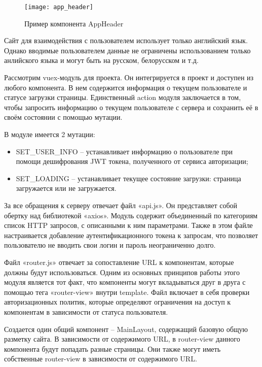 \begin{figure}[h]
    \centering
    \texttt{[image: app\_header]}
    \caption{Пример компонента AppHeader}\label{fig:app_header}
\end{figure}

Сайт для взаимодействия с пользователем использует только английский язык. Однако вводимые пользователем данные не ограничены использованием только анлийского языка и могут быть на русском, белорусском и т.д.

Рассмотрим vuex-модуль для проекта. Он интегрируется в проект и доступен из любого компонента. В нем содержится информация о текущем пользователе и статусе загрузки страницы. Единственный action модуля заключается в том, чтобы запросить информацию о текущем пользователе с сервера и сохранить её в своём состоянии с помощью мутации.

В модуле имеется 2 мутации:

\begin{itemize}
    \item SET\_USER\_INFO – устанавливает информацию о пользователе при помощи дешифрования JWT токена, полученного от сервиса авторизации;
    \item SET\_LOADING – устанавливает текущее состояние загрузки: страница загружается или не загружается.
\end{itemize}

За все обращения к серверу отвечает файл «api.js». Он представляет собой обертку над библиотекой «axios». Модуль содержит объединенный по категориям список HTTP запросов, с описанными к ним параметрами. Также в этом файле настраивается добавление аутентификационного токена к запросам, что позволяет пользователю не вводить свои логин и пароль неограниченно долго. 

Файл «router.js» отвечает за сопоставление URL к компонентам, которые должны будут использоваться. Одним из основных принципов работы этого модуля является тот факт, что компоненты могут вкладываться друг в друга с помощью тега «router-view» внутри template. Файл включает в себя проверки авторизационных политик, которые определяют ограничения на доступ к компонентам в зависимости от статуса пользователя.

Создается один общий компонент – MainLayout, содержащий базовую общую разметку сайта. В зависимости от содержимого URL, в router-view данного компонента будут попадать разные страницы. Они также могут иметь собственные router-view в зависимости от содержимого URL.

